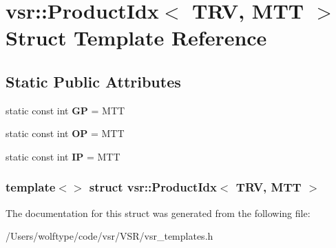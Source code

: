 \hypertarget{structvsr_1_1_product_idx_3_01_t_r_v_00_01_m_t_t_01_4}{\section{vsr\-:\-:Product\-Idx$<$ T\-R\-V, M\-T\-T $>$ Struct Template Reference}
\label{structvsr_1_1_product_idx_3_01_t_r_v_00_01_m_t_t_01_4}
}
\subsection*{Static Public Attributes}
\begin{DoxyCompactItemize}
\item 
\hypertarget{structvsr_1_1_product_idx_3_01_t_r_v_00_01_m_t_t_01_4_aa573cd57a210be95736bff746591a811}{static const int {\bfseries G\-P} = M\-T\-T}\label{structvsr_1_1_product_idx_3_01_t_r_v_00_01_m_t_t_01_4_aa573cd57a210be95736bff746591a811}

\item 
\hypertarget{structvsr_1_1_product_idx_3_01_t_r_v_00_01_m_t_t_01_4_a02b74a94cecd1cac9baacb937632cd58}{static const int {\bfseries O\-P} = M\-T\-T}\label{structvsr_1_1_product_idx_3_01_t_r_v_00_01_m_t_t_01_4_a02b74a94cecd1cac9baacb937632cd58}

\item 
\hypertarget{structvsr_1_1_product_idx_3_01_t_r_v_00_01_m_t_t_01_4_ae298554158b1ffda817d15808d1ac172}{static const int {\bfseries I\-P} = M\-T\-T}\label{structvsr_1_1_product_idx_3_01_t_r_v_00_01_m_t_t_01_4_ae298554158b1ffda817d15808d1ac172}

\end{DoxyCompactItemize}
\subsubsection*{template$<$$>$ struct vsr\-::\-Product\-Idx$<$ T\-R\-V, M\-T\-T $>$}



The documentation for this struct was generated from the following file\-:\begin{DoxyCompactItemize}
\item 
/\-Users/wolftype/code/vsr/\-V\-S\-R/vsr\-\_\-templates.\-h\end{DoxyCompactItemize}
